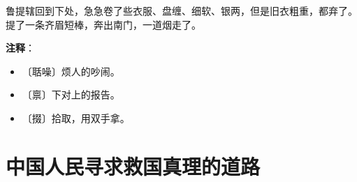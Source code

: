 \documentclass[12pt,UTF-8,openany]{ctexbook}
\begin{document}
\begin{large}
    鲁提辖回到下处，急急卷了些衣服、盘缠、细软、银两，但是旧衣粗重，都弃了。提了一条齐眉短棒，奔出南门，一道烟走了。
    
\end{large}


\newpage

\textbf{注释}：

\vspace{-1em}

\begin{itemize}
    \setlength\itemsep{-0.2em}
    \item 〔聒噪〕烦人的吵闹。
    \item 〔禀〕下对上的报告。
    \item 〔掇〕拾取，用双手拿。
\end{itemize}

\chapter{中国人民寻求救国真理的道路}
\end{document}
